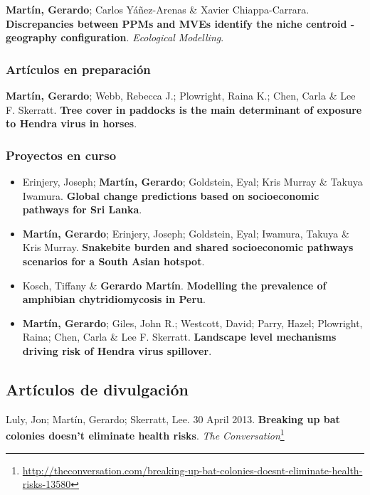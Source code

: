 \documentclass[11pt, letter]{article}
\newcommand{\years}[1]{\marginnote{\scriptsize #1}}
\begin{document}
\years{2021} \textbf{Mart\'in, Gerardo}; Carlos Y\'a\~nez-Arenas \& Xavier Chiappa-Carrara. \textbf{Discrepancies between PPMs and MVEs identify the niche centroid - geography configuration}. \emph{Ecological Modelling}.

\subsubsection*{Art\'iculos en preparaci\'on}

\years{2019} \textbf{Mart\'in, Gerardo}; Webb, Rebecca J.; Plowright, Raina K.; Chen, Carla \& Lee F. Skerratt. \textbf{Tree cover in paddocks is the main determinant of exposure to Hendra virus in horses}.\\

\subsubsection*{Proyectos en curso}

\begin{itemize}

	\item  Erinjery, Joseph; \textbf{Mart\'in, Gerardo}; Goldstein, Eyal; Kris Murray \& Takuya Iwamura. \textbf{Global change predictions based on socioeconomic pathways for Sri Lanka}.\\
	
	\item \textbf{Mart\'in, Gerardo}; Erinjery, Joseph; Goldstein, Eyal; Iwamura, Takuya \& Kris Murray. \textbf{Snakebite burden and shared socioeconomic pathways scenarios for a South Asian hotspot}.\\
	
	\item Kosch, Tiffany \& \textbf{Gerardo Mart\'in}. \textbf{Modelling the prevalence of amphibian chytridiomycosis in Peru}.\\
	
	\item \textbf{Mart\'in, Gerardo}; Giles, John R.; Westcott, David; Parry, Hazel; Plowright, Raina; Chen, Carla \& Lee F. Skerratt. \textbf{Landscape level mechanisms driving risk of Hendra virus spillover}.\\
\end{itemize}



\subsection*{Art\'iculos de divulgaci\'on}
\noindent
\years{2013}Luly, Jon; Mart\'in, Gerardo; Skerratt, Lee. 30 April 2013. \textbf{Breaking up bat colonies doesn't eliminate health risks}. \emph{The Conversation}\footnote{\url{http://theconversation.com/breaking-up-bat-colonies-doesnt-eliminate-health-risks-13580}}
\end{document}
